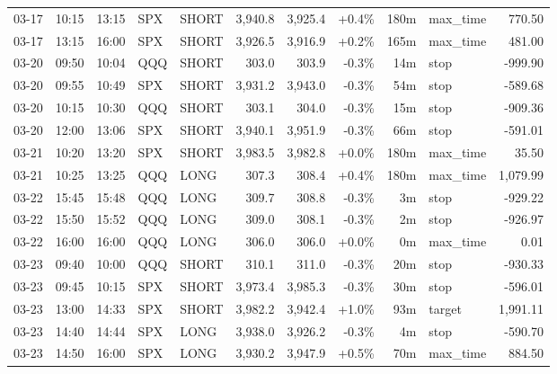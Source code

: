 \documentclass[11pt,a4paper,twoside]{article}
\begin{document}
\begin{center}
\begin{longtable}{>{\color{txtmain}}l l l l l r r r r >{\color{txtmain}}l r}
03-17 & 10:15 & 13:15 & SPX & SHORT & 3,940.8 & 3,925.4 & \textcolor{wingreen}{+0.4\%} & 180m & max\_time & \textcolor{wingreen}{770.50} \\
03-17 & 13:15 & 16:00 & SPX & SHORT & 3,926.5 & 3,916.9 & \textcolor{wingreen}{+0.2\%} & 165m & max\_time & \textcolor{wingreen}{481.00} \\
03-20 & 09:50 & 10:04 & QQQ & SHORT & 303.0 & 303.9 & \textcolor{lossred}{-0.3\%} & 14m & stop & \textcolor{lossred}{-999.90} \\
03-20 & 09:55 & 10:49 & SPX & SHORT & 3,931.2 & 3,943.0 & \textcolor{lossred}{-0.3\%} & 54m & stop & \textcolor{lossred}{-589.68} \\
03-20 & 10:15 & 10:30 & QQQ & SHORT & 303.1 & 304.0 & \textcolor{lossred}{-0.3\%} & 15m & stop & \textcolor{lossred}{-909.36} \\
03-20 & 12:00 & 13:06 & SPX & SHORT & 3,940.1 & 3,951.9 & \textcolor{lossred}{-0.3\%} & 66m & stop & \textcolor{lossred}{-591.01} \\
03-21 & 10:20 & 13:20 & SPX & SHORT & 3,983.5 & 3,982.8 & \textcolor{wingreen}{+0.0\%} & 180m & max\_time & \textcolor{wingreen}{35.50} \\
03-21 & 10:25 & 13:25 & QQQ & LONG & 307.3 & 308.4 & \textcolor{wingreen}{+0.4\%} & 180m & max\_time & \textcolor{wingreen}{1,079.99} \\
03-22 & 15:45 & 15:48 & QQQ & LONG & 309.7 & 308.8 & \textcolor{lossred}{-0.3\%} & 3m & stop & \textcolor{lossred}{-929.22} \\
03-22 & 15:50 & 15:52 & QQQ & LONG & 309.0 & 308.1 & \textcolor{lossred}{-0.3\%} & 2m & stop & \textcolor{lossred}{-926.97} \\
03-22 & 16:00 & 16:00 & QQQ & LONG & 306.0 & 306.0 & \textcolor{wingreen}{+0.0\%} & 0m & max\_time & \textcolor{wingreen}{0.01} \\
03-23 & 09:40 & 10:00 & QQQ & SHORT & 310.1 & 311.0 & \textcolor{lossred}{-0.3\%} & 20m & stop & \textcolor{lossred}{-930.33} \\
03-23 & 09:45 & 10:15 & SPX & SHORT & 3,973.4 & 3,985.3 & \textcolor{lossred}{-0.3\%} & 30m & stop & \textcolor{lossred}{-596.01} \\
03-23 & 13:00 & 14:33 & SPX & SHORT & 3,982.2 & 3,942.4 & \textcolor{wingreen}{+1.0\%} & 93m & target & \textcolor{wingreen}{1,991.11} \\
03-23 & 14:40 & 14:44 & SPX & LONG & 3,938.0 & 3,926.2 & \textcolor{lossred}{-0.3\%} & 4m & stop & \textcolor{lossred}{-590.70} \\
03-23 & 14:50 & 16:00 & SPX & LONG & 3,930.2 & 3,947.9 & \textcolor{wingreen}{+0.5\%} & 70m & max\_time & \textcolor{wingreen}{884.50} \\

\end{longtable}
\end{center}
\end{document}

